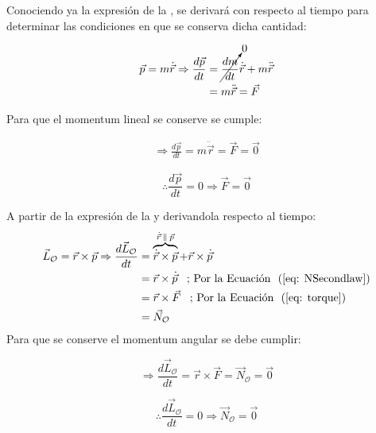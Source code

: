 \documentclass[/home/hernan-barquero/Documents/Apuntes_mecanica_teorica/main.tex]{subfiles}
\begin{document}
	\begin{theorem}
		Conociendo ya la expresión de la , se derivará con respecto al tiempo para determinar las condiciones en que se conserva dicha cantidad:

		\begin{align*}
			\vec{p} = m \dot{\vec{r}} \Rightarrow \frac{d\vec{p}}{dt} &= \cancelto{0}{\frac{dm}{dt}} \dot{\vec{r}} + m \ddot{\vec{r}}\\ 
																	& = m \ddot{\vec{r}} = \vec{F}
		\end{align*}

		Para que el momentum lineal se conserve se cumple: 

		\begin{align*}
			\Rightarrow \frac{d\vec{p}}{dt} = m \ddot{\vec{r}} = \vec{F} = \vec{0}
		\end{align*}


		\begin{equation}
			\therefore \frac{d\vec{p}}{dt} = 0 \Rightarrow \vec{F} = \vec{0}
			\label{eq: momentumlcons}
		\end{equation}
		
	\end{theorem}

	\begin{theorem}
		A partir de la expresión de la  y derivandola respecto al tiempo:
		\begin{align*}
			\vec{L}_{\mathcal{O}} = \vec{r} \times \vec{p} \Rightarrow \frac{d \vec{L}_{\mathcal{O}}}{dt} & = \overbrace{\dot{\vec{r}} \times \vec{p}}^{\dot{\vec{r}} \: \parallel \: \vec{p} } + \vec{r} \times \dot{\vec{p}} \\ 
			& = \vec{r} \times \dot{\vec{p}} \; \; \; \textup{; Por la \Eqref{eq: NSecondlaw}} \\ 
			& =  \vec{r} \times \vec{F} \; \; \; \textup{; Por la \Eqref{eq: torque}} \\
			& = \vec{N}_{\mathcal{O}}
		\end{align*}
		Para que se conserve el momentum angular se debe cumplir:

		\begin{equation*}
			\Rightarrow \frac{d \vec{L}_{\mathcal{O}}}{dt} =  \vec{r} \times \vec{F} = \vec{N}_{\mathcal{O}} = \vec{0}
		\end{equation*}

		\begin{equation}
			\therefore \frac{d \vec{L}_{\mathcal{O}}}{dt} = 0 \Rightarrow  \vec{N}_{\mathcal{O}} = \vec{0}
			\label{eq: momentumAcons}
		\end{equation}
	\end{theorem}
\end{document}
